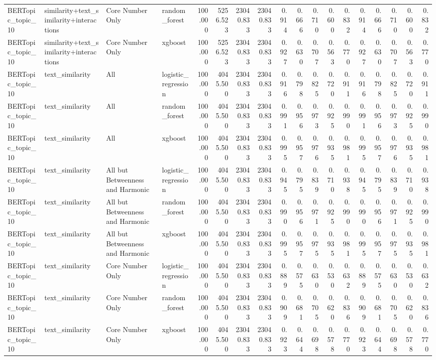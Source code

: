 \begin{tabular}{llllrrrrrrrrrrrrrr}
BERTopic_topic_10 & similarity+text_similarity+interactions & Core Number Only & random_forest & 100.000 & 5256.523 & 23040.833 & 23040.833 & 0.914 & 0.666 & 0.710 & 0.600 & 0.832 & 0.914 & 0.666 & 0.710 & 0.600 & 0.832 \\
BERTopic_topic_10 & similarity+text_similarity+interactions & Core Number Only & xgboost & 100.000 & 5256.523 & 23040.833 & 23040.833 & 0.927 & 0.630 & 0.707 & 0.563 & 0.770 & 0.927 & 0.630 & 0.707 & 0.563 & 0.770 \\
BERTopic_topic_10 & text_similarity & All & logistic_regression & 100.000 & 4045.500 & 23040.833 & 23040.833 & 0.916 & 0.798 & 0.825 & 0.720 & 0.911 & 0.916 & 0.798 & 0.825 & 0.720 & 0.911 \\
BERTopic_topic_10 & text_similarity & All & random_forest & 100.000 & 4045.500 & 23040.833 & 23040.833 & 0.991 & 0.956 & 0.973 & 0.925 & 0.990 & 0.991 & 0.956 & 0.973 & 0.925 & 0.990 \\
BERTopic_topic_10 & text_similarity & All & xgboost & 100.000 & 4045.500 & 23040.833 & 23040.833 & 0.995 & 0.957 & 0.976 & 0.935 & 0.981 & 0.995 & 0.957 & 0.976 & 0.935 & 0.981 \\
BERTopic_topic_10 & text_similarity & All but Betweenness and Harmonic & logistic_regression & 100.000 & 4045.500 & 23040.833 & 23040.833 & 0.945 & 0.795 & 0.839 & 0.710 & 0.938 & 0.945 & 0.795 & 0.839 & 0.710 & 0.938 \\
BERTopic_topic_10 & text_similarity & All but Betweenness and Harmonic & random_forest & 100.000 & 4045.500 & 23040.833 & 23040.833 & 0.990 & 0.956 & 0.971 & 0.925 & 0.990 & 0.990 & 0.956 & 0.971 & 0.925 & 0.990 \\
BERTopic_topic_10 & text_similarity & All but Betweenness and Harmonic & xgboost & 100.000 & 4045.500 & 23040.833 & 23040.833 & 0.995 & 0.957 & 0.975 & 0.935 & 0.981 & 0.995 & 0.957 & 0.975 & 0.935 & 0.981 \\
BERTopic_topic_10 & text_similarity & Core Number Only & logistic_regression & 100.000 & 4045.500 & 23040.833 & 23040.833 & 0.889 & 0.575 & 0.630 & 0.530 & 0.632 & 0.889 & 0.575 & 0.630 & 0.530 & 0.632 \\
BERTopic_topic_10 & text_similarity & Core Number Only & random_forest & 100.000 & 4045.500 & 23040.833 & 23040.833 & 0.909 & 0.681 & 0.705 & 0.620 & 0.836 & 0.909 & 0.681 & 0.705 & 0.620 & 0.836 \\
BERTopic_topic_10 & text_similarity & Core Number Only & xgboost & 100.000 & 4045.500 & 23040.833 & 23040.833 & 0.923 & 0.644 & 0.698 & 0.578 & 0.770 & 0.923 & 0.644 & 0.698 & 0.578 & 0.770 \\

\end{tabular}
